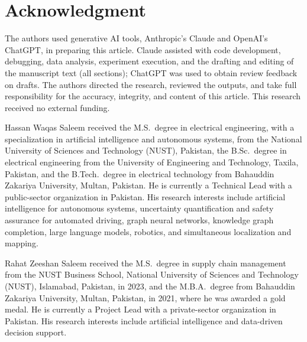 \documentclass[lettersize,journal]{IEEEtran}
\begin{document}
\section*{Acknowledgment}
The authors used generative AI tools, Anthropic's Claude and OpenAI's ChatGPT, in preparing this article. Claude assisted with
code development, debugging, data analysis, experiment execution, and the drafting and editing of the manuscript text (all
sections); ChatGPT was used to obtain review feedback on drafts. The authors directed the research, reviewed the outputs, and
take full responsibility for the accuracy, integrity, and content of this article. This research received no external funding.




\begin{IEEEbiographynophoto}{Hassan Waqas Saleem}
received the M.S.\ degree in electrical engineering, with a specialization in artificial intelligence and autonomous systems, from
the National University of Sciences and Technology (NUST), Pakistan, the B.Sc.\ degree in electrical engineering from the
University of Engineering and Technology, Taxila, Pakistan, and the B.Tech.\ degree in electrical technology from Bahauddin
Zakariya University, Multan, Pakistan. He is currently a Technical Lead with a public-sector organization in Pakistan. His
research interests include artificial intelligence for autonomous systems, uncertainty quantification and safety assurance for
automated driving, graph neural networks, knowledge graph completion, large language models, robotics, and simultaneous
localization and mapping.
\end{IEEEbiographynophoto}

\begin{IEEEbiographynophoto}{Rahat Zeeshan Saleem}
received the M.S.\ degree in supply chain management from the NUST Business School, National University of Sciences and
Technology (NUST), Islamabad, Pakistan, in 2023, and the M.B.A.\ degree from Bahauddin Zakariya University, Multan, Pakistan,
in 2021, where he was awarded a gold medal. He is currently a Project Lead with a private-sector organization in Pakistan. His
research interests include artificial intelligence and data-driven decision support.
\end{IEEEbiographynophoto}
\end{document}
